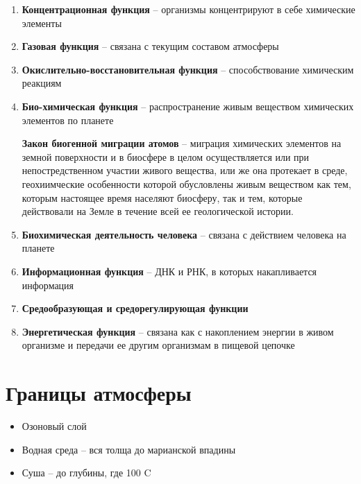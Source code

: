 \begin{enumerate}
    \item \textbf{Концентрационная функция} --
        организмы концентрируют в себе химические элементы

    \item \textbf{Газовая функция} --
        связана с текущим составом атмосферы

    \item \textbf{Окислительно-восстановительная функция} --
        способствование химическим реакциям

    \item \textbf{Био-химическая функция} --
        распространение живым веществом химических элементов по планете

        \textbf{Закон биогенной миграции атомов} --
        миграция химических элементов на земной поверхности
        и в биосфере в целом осуществляется или при непостредственном
        участии живого вещества, или же она протекает в среде,
        геохиимческие особенности которой обусловлены живым веществом
        как тем, которым настоящее время населяют биосферу, так и тем,
        которые действовали на Земле в течение всей ее геологической
        истории.

    \item \textbf{Биохимическая деятельность человека} --
        связана с действием человека на планете

    \item \textbf{Информационная функция} --
        ДНК и РНК, в которых накапливается информация

    \item \textbf{Средообразующая и средорегулирующая функции}

    \item \textbf{Энергетическая функция} --
        связана как с накоплением энергии в живом организме и передачи ее
        другим организмам в пищевой цепочке
\end{enumerate}

\section{Границы атмосферы}

\begin{itemize}
    \item Озоновый слой
    \item Водная среда -- вся толща до марианской впадины
    \item Суша -- до глубины, где 100 C
\end{itemize}

